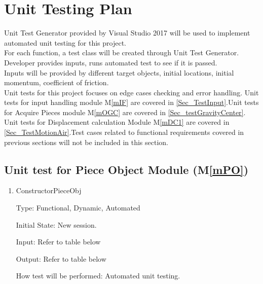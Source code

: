 \documentclass[12pt, titlepage]{article}
\newcommand{\mref}[1]{M\ref{#1}}
\begin{document}
	\section{Unit Testing Plan}
	\label{Sec_UnitTest}
	Unit Test Generator provided by Visual Studio 2017 will be used to implement automated unit testing for this project.\\
	For each function, a test class will be created through Unit Test Generator. Developer provides inputs, runs automated test to see if it is passed.\\
	Inputs will be provided by different target objects, initial locations, initial momentum, coefficient of friction. \\
	Unit tests for this project focuses on edge cases checking and error handling. Unit tests for input handling module \mref{mIF} are covered in \ref{Sec_TestInput}.Unit tests for Acquire Pieces module \mref{mOGC} are covered in \ref{Sec_testGravityCenter}. Unit tests for Displacement calculation Module \mref{mDC1} are covered in \ref{Sec_TestMotionAir}.Test cases related to functional requirements covered in previous sections will not be included in this section.\\ 
	
	\subsection{Unit test for Piece Object Module (\mref{mPO})}
	
	\begin{enumerate}	
		\item{ConstructorPieceObj}
		
		Type: Functional, Dynamic, Automated
		
		Initial State: New session.
		
		Input: Refer to table below
		
		Output: Refer to table below
		
		How test will be performed: Automated unit testing.
	\end{enumerate}
\end{document}
